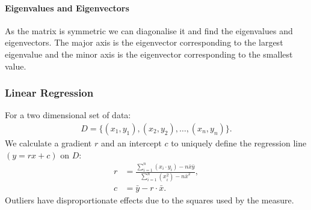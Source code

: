 \paragraph{Eigenvalues and Eigenvectors} As the matrix is symmetric
we can diagonalise it and find the eigenvalues and eigenvectors.
The major axis is the eigenvector corresponding to the largest
eigenvalue and the minor axis is the eigenvector corresponding
to the smallest value.

\subsubsection{Linear Regression}

For a two dimensional set of data: \begin{gather*}
    D = \{(x_1, y_1), (x_2, y_2), \ldots, (x_n, y_n)\}.
\end{gather*} We calculate a gradient $r$ and an intercept $c$ to 
uniquely define the regression line $(y = rx + c)$ on $D$: \begin{align*}
    r &= \frac{
        \sum_{i = 1}^n (x_i \cdot y_i) - n\bar{x}\bar{y}
    }{
        \sum_{i = 1}^n (x_i^2) - n\bar{x}^2
    }, \\
    c &= \bar{y} - r \cdot \bar{x}.
\end{align*} Outliers have disproportionate effects due to the
squares used by the measure. 

\newpage

